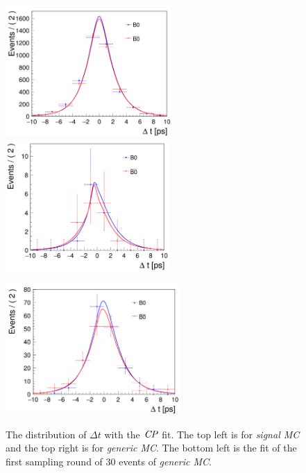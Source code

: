 \begin{figure}[htpb]
	\begin{minipage}[t]{0.5\linewidth}
		\includegraphics[height=5cm]{figures/cpfit-10000sig}
		\includegraphics[height=5cm]{figures/cpfit-30gen}
		\label{fig:cpfit_sig}
	\end{minipage}
	\begin{minipage}[t]{0.5\linewidth}
		\includegraphics[height=5cm]{figures/cpfit-373gen}
		\label{fig:cpfit_gen}
	\end{minipage}
\caption{The distribution of $\Delta t$ with the $\it{CP}$ fit. The top left is for \textit{signal MC} and the top right is for \textit{generic MC}. The bottom left is the fit of the first sampling round of 30 events of \textit{generic MC}.}
\label{fig:cpfitmc}
\end{figure}


